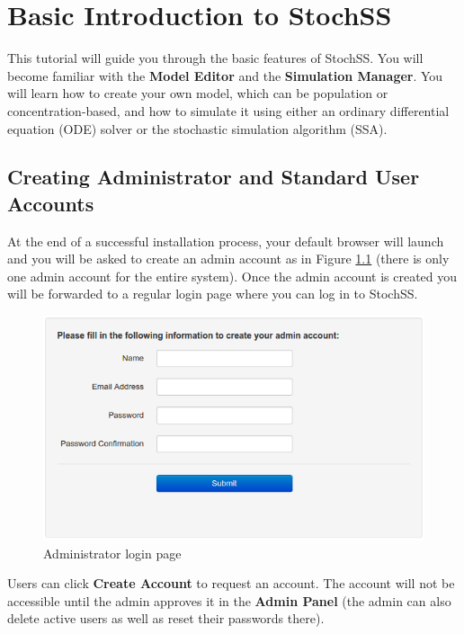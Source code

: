 \chapter{Basic Introduction to StochSS}
\label{chapter1}
This tutorial will guide you through the basic features of StochSS. You will become familiar with the \textbf{Model Editor} and the \textbf{Simulation Manager}. You will learn how to create your own model, which can be population or concentration-based, and how to simulate it using either an ordinary differential equation (ODE) solver or the stochastic simulation algorithm (SSA).

\section{\label{sec:acc} Creating Administrator and Standard User Accounts}
At the end of a successful installation process, your default browser will launch and you will be asked to create an admin account as in Figure \ref{fig:admin} (there is only one admin account for the entire system).
Once the admin account is created you will be forwarded to a regular login page where you can log in to StochSS.

\begin{figure}[!htb]
\centering
\includegraphics[scale=0.64]{T1/admin.png}
\caption{Administrator login page}
\label{fig:admin}
\end{figure}

Users can click \textbf{Create Account} to request an account.
The account will not be accessible until the admin approves it in the \textbf{Admin Panel} (the admin can also delete active users as well as reset their passwords there).
%


